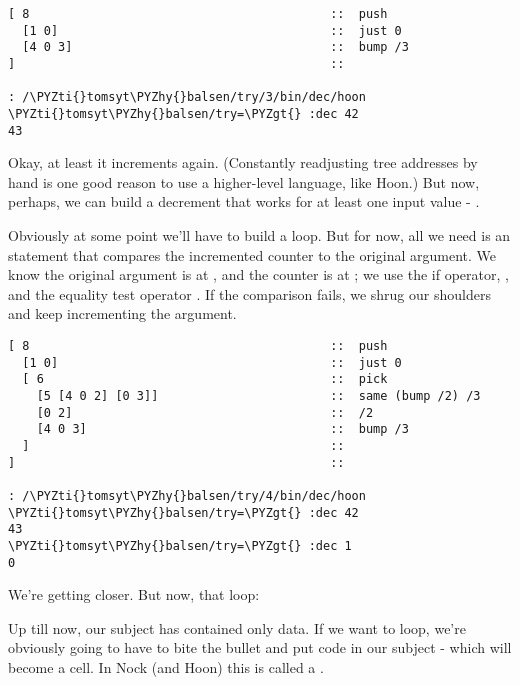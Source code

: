 \begin{framed_shaded}
\begin{Verbatim}[fontsize=\relsize{-2.5},commandchars=\\\{\}]
[ 8                                          ::  push
  [1 0]                                      ::  just 0
  [4 0 3]                                    ::  bump /3
]                                            ::

: /\PYZti{}tomsyt\PYZhy{}balsen/try/3/bin/dec/hoon
\PYZti{}tomsyt\PYZhy{}balsen/try=\PYZgt{} :dec 42
43
\end{Verbatim}
\end{framed_shaded}
Okay, at least it increments again.  (Constantly readjusting tree
addresses by hand is one good reason to use a higher-level
language, like Hoon.) But now, perhaps, we can build a decrement
that works for at least one input value - .

Obviously at some point we'll have to build a loop.  But for now,
all we need is an  statement that compares the incremented
counter to the original argument.  We know the original argument
is at , and the counter is at ; we use the if operator,
, and the equality test operator .  If the comparison
fails, we shrug our shoulders and keep incrementing the argument.

\begin{framed_shaded}
\begin{Verbatim}[fontsize=\relsize{-2.5},commandchars=\\\{\}]
[ 8                                          ::  push
  [1 0]                                      ::  just 0
  [ 6                                        ::  pick
    [5 [4 0 2] [0 3]]                        ::  same (bump /2) /3
    [0 2]                                    ::  /2
    [4 0 3]                                  ::  bump /3
  ]                                          :: 
]                                            :: 

: /\PYZti{}tomsyt\PYZhy{}balsen/try/4/bin/dec/hoon
\PYZti{}tomsyt\PYZhy{}balsen/try=\PYZgt{} :dec 42
43
\PYZti{}tomsyt\PYZhy{}balsen/try=\PYZgt{} :dec 1
0
\end{Verbatim}
\end{framed_shaded}
We're getting closer.  But now, that loop:

Up till now, our subject has contained only data.  If we want to
loop, we're obviously going to have to bite the bullet and put
code in our subject - which will become a  cell.
In Nock (and Hoon) this is called a .

